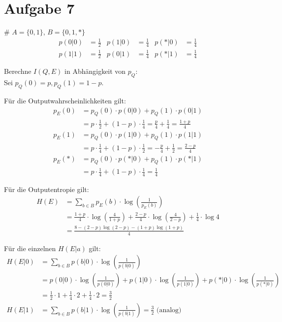 \section*{Aufgabe 7}
\begin{myList}
#
$A = \lbrace 0,1 \rbrace$, $B = \lbrace 0,1,\ast \rbrace$
\begin{align*}
	p(0|0) &= \frac{1}{2} & p(1|0) &= \frac{1}{4} & p(\ast|0) &= \frac{1}{4} \\
	p(1|1) &= \frac{1}{2} & p(0|1) &= \frac{1}{4} & p(\ast|1) &= \frac{1}{4} 
\end{align*}

Berechne $I(Q,E)$ in Abhängigkeit von $p_Q$:\\
Sei $p_Q(0) = p, p_Q(1) = 1-p$.

Für die Outputwahrscheinlichkeiten gilt:
\begin{align*}
	p_E(0) &= p_Q(0) \cdot p(0|0) + p_Q(1) \cdot p(0|1)\\
	&= p \cdot \frac{1}{2} + (1-p) \cdot \frac{1}{4}  = \frac{p}{4} + \frac{1}{4} = \frac{1 + p}{4}\\
	p_E(1) &= p_Q(0) \cdot p(1|0) + p_Q(1) \cdot p(1|1)\\
	&= p \cdot \frac{1}{4} + (1-p) \cdot \frac{1}{2} = -\frac{p}{4} + \frac{1}{2} = \frac{2 - p}{4}\\
	p_E(\ast) &= p_Q(0) \cdot p(\ast|0) + p_Q(1) \cdot p(\ast|1)\\
	&= p \cdot \frac{1}{4} + (1-p) \cdot \frac{1}{4} = \frac{1}{4}
\end{align*}

Für die Outputentropie gilt:
\begin{align*}
	H(E) &= \sum\limits_{b \in B} p_E(b) \cdot \log \left( \frac{1}{p_E(b)}\right) \\
	&= \frac{1+p}{4}\cdot \log \left( \frac{4}{1+p}\right) + \frac{2-p}{4} \cdot \log \left( \frac{4}{2-p} \right) + \frac{1}{4}\cdot \log 4 \\
	&= \frac{8 - (2-p)\log(2-p) - (1+p)\log(1+p)}{4}
\end{align*}

Für die einzelnen $H(E|a)$ gilt:
\begin{align*}
	H(E|0) &= \sum\limits_{b\in B} p(b|0) \cdot \log \left(\frac{1}{p(b|0)} \right)\\
	&= p(0|0) \cdot \log \left(\frac{1}{p(0|0)} \right) + p(1|0) \cdot \log \left(\frac{1}{p(1|0)} \right) + p(\ast|0) \cdot \log \left(\frac{1}{p(\ast|0)} \right)\\
	&= \frac{1}{2} \cdot 1 + \frac{1}{4} \cdot 2 + \frac{1}{4} \cdot 2 = \frac{3}{2}\\
	H(E|1) &= \sum\limits_{b\in B} p(b|1) \cdot \log \left(\frac{1}{p(b|1)} \right) = \frac{3}{2} \text{ (analog)}
\end{align*}


\end{myList}
